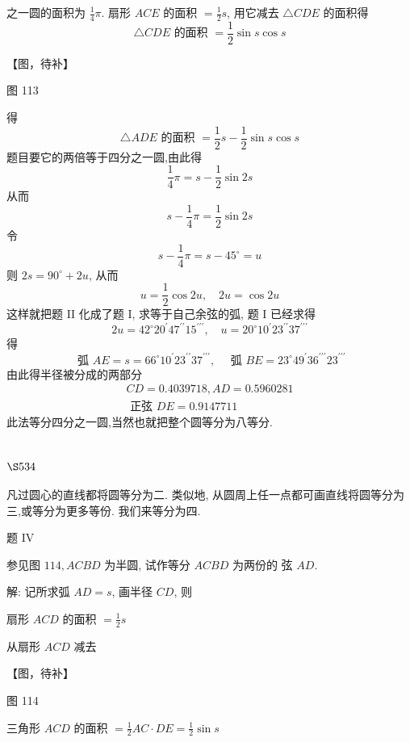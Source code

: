 之一圆的面积为 $\frac{1}{4} \pi$. 扇形 $A C E$ 的面积 $=\frac{1}{2} s$, 用它减去 $\triangle C D E$ 的面积得
\[
\triangle C D E \text { 的面积 }=\frac{1}{2} \sin s \cos s
\]

【图，待补】

图 113

得
\[
\triangle A D E \text { 的面积 }=\frac{1}{2} s-\frac{1}{2} \sin s \cos s
\]
题目要它的两倍等于四分之一圆,由此得
\[
\frac{1}{4} \pi=s-\frac{1}{2} \sin 2 s
\]
从而
\[
s-\frac{1}{4} \pi=\frac{1}{2} \sin 2 s
\]
令
\[
s-\frac{1}{4} \pi=s-45^{\circ}=u
\]
则 $2 s=90^{\circ}+2 u$, 从而
\[
u=\frac{1}{2} \cos 2 u, \quad 2 u=\cos 2 u
\]
这样就把题 II 化成了题 I, 求等于自己余弦的弧, 题 I 已经求得
\[
2 u=42^{\circ} 20^{\prime} 47^{\prime \prime} 15^{\prime \prime \prime}, \quad u=20^{\circ} 10^{\prime} 23^{\prime \prime} 37^{\prime \prime \prime}
\]
得
\[
\text { 弧 } A E=s=66^{\circ} 10^{\prime} 23^{\prime \prime} 37^{\prime \prime \prime}, \quad \text { 弧 } B E=23^{\circ} 49^{\prime} 36^{\prime \prime \prime} 23^{\prime \prime \prime}
\]
由此得半径被分成的两部分
\[
\begin{gathered}
C D=0.4039718, A D=0.5960281 \\
\text { 正弦 } D E=0.9147711
\end{gathered}
\]
此法等分四分之一圆,当然也就把整个圆等分为八等分.

\section{$\S 534$}

凡过圆心的直线都将圆等分为二. 类似地, 从圆周上任一点都可画直线将圆等分为 三,或等分为更多等份. 我们来等分为四.

题 IV

参见图 $114, A C B D$ 为半圆, 试作等分 $A C B D$ 为两份的 弦 $A D$.

解: 记所求弧 $A D=s$, 画半径 $C D$, 则

扇形 $A C D$ 的面积 $=\frac{1}{2} s$

从扇形 $A C D$ 减去


【图，待补】

图 114

三角形 $A C D$ 的面积 $=\frac{1}{2} A C \cdot D E=\frac{1}{2} \sin s$

